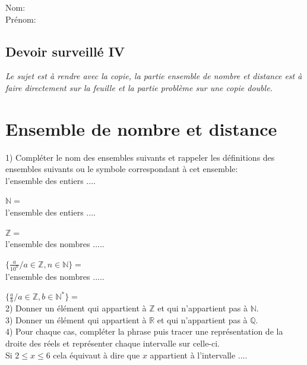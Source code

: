 \documentclass[french]{article}
\begin{document}
Nom: \\

Prénom:

\begin{center}
\section*{Devoir surveillé IV} 
\textit{Le sujet est à rendre avec la copie, la partie ensemble de nombre et distance est à faire directement sur la feuille et la partie problème sur une copie double.}
\end{center}

\section*{Ensemble de nombre et distance}

1) Compléter le nom des ensembles suivants et rappeler les définitions des ensembles suivants ou le symbole correspondant à cet ensemble: \\

l'ensemble des entiers ....

$\mathbb{N}=$ \\

l'ensemble des entiers ....

$\mathbb{Z}=$ \\

l'ensemble des nombres .....

$\{ \frac{a}{10^n} / a \in \mathbb{Z}, n \in \mathbb{N} \}=$ \\


l'ensemble des nombres .....

$\{ \frac{a}{b} / a \in \mathbb{Z}, b \in \mathbb{N}^* \}=$ \\

2) Donner un élément qui appartient à $\mathbb{Z}$ et qui n'appartient pas à $\mathbb{N}$. \\

3) Donner un élément qui appartient à $\mathbb{R}$ et qui n'appartient pas à $\mathbb{Q}$.\\



4) Pour chaque cas, compléter la phrase puis tracer une représentation de la droite des réels et représenter chaque intervalle sur celle-ci. \\



Si $ 2 \leq x \leq 6 $ cela équivaut à dire que $x$ appartient à l'intervalle .... \\
\end{document}
